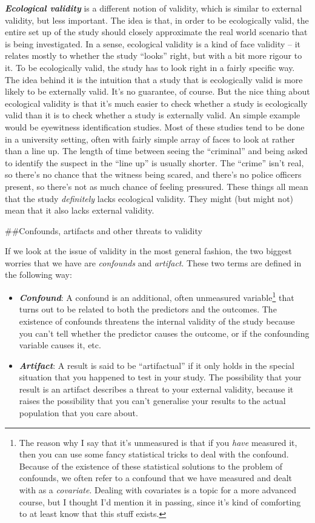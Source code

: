 \documentclass[]{book}
\providecommand{\tightlist}{%
  \setlength{\itemsep}{0pt}\setlength{\parskip}{0pt}}
\begin{document}
\textbf{\emph{Ecological validity}} is a different notion of validity, which is similar to external validity, but less important. The idea is that, in order to be ecologically valid, the entire set up of the study should closely approximate the real world scenario that is being investigated. In a sense, ecological validity is a kind of face validity -- it relates mostly to whether the study ``looks'' right, but with a bit more rigour to it. To be ecologically valid, the study has to look right in a fairly specific way. The idea behind it is the intuition that a study that is ecologically valid is more likely to be externally valid. It's no guarantee, of course. But the nice thing about ecological validity is that it's much easier to check whether a study is ecologically valid than it is to check whether a study is externally valid. An simple example would be eyewitness identification studies. Most of these studies tend to be done in a university setting, often with fairly simple array of faces to look at rather than a line up. The length of time between seeing the ``criminal'' and being asked to identify the suspect in the ``line up'' is usually shorter. The ``crime'' isn't real, so there's no chance that the witness being scared, and there's no police officers present, so there's not as much chance of feeling pressured. These things all mean that the study \emph{definitely} lacks ecological validity. They might (but might not) mean that it also lacks external validity.

\#\#Confounds, artifacts and other threats to validity

If we look at the issue of validity in the most general fashion, the two biggest worries that we have are \emph{confounds} and \emph{artifact}. These two terms are defined in the following way:

\begin{itemize}
\tightlist
\item
  \textbf{\emph{Confound}}: A confound is an additional, often unmeasured variable\footnote{The reason why I say that it's unmeasured is that if you \emph{have} measured it, then you can use some fancy statistical tricks to deal with the confound. Because of the existence of these statistical solutions to the problem of confounds, we often refer to a confound that we have measured and dealt with as a \emph{covariate}. Dealing with covariates is a topic for a more advanced course, but I thought I'd mention it in passing, since it's kind of comforting to at least know that this stuff exists.} that turns out to be related to both the predictors and the outcomes. The existence of confounds threatens the internal validity of the study because you can't tell whether the predictor causes the outcome, or if the confounding variable causes it, etc.
\item
  \textbf{\emph{Artifact}}: A result is said to be ``artifactual'' if it only holds in the special situation that you happened to test in your study. The possibility that your result is an artifact describes a threat to your external validity, because it raises the possibility that you can't generalise your results to the actual population that you care about.
\end{itemize}
\end{document}
